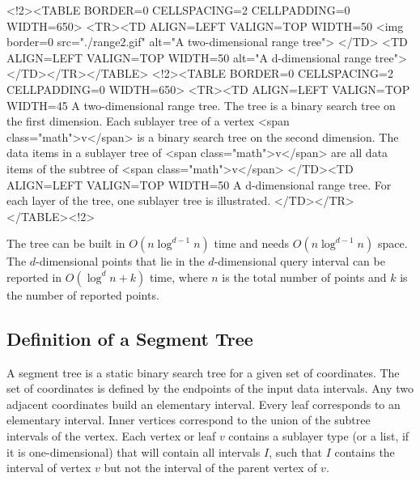 \begin{ccHtmlOnly}
    <!2><TABLE BORDER=0 CELLSPACING=2 CELLPADDING=0 WIDTH=650>
        <TR><TD ALIGN=LEFT VALIGN=TOP WIDTH=50%
    <img border=0 src="./range2.gif" alt="A two-dimensional range tree">
    </TD>
    <TD ALIGN=LEFT VALIGN=TOP WIDTH=50%
alt="A
    d-dimensional range tree">
      </TD></TR></TABLE>
        <!2><TABLE BORDER=0 CELLSPACING=2 CELLPADDING=0 WIDTH=650>
        <TR><TD ALIGN=LEFT VALIGN=TOP WIDTH=45%
    A two-dimensional range tree. The
      tree is a binary search tree on the first dimension. Each
      sublayer tree of a vertex <span class="math">v</span> is a binary search tree on the
second
      dimension. The data items in a sublayer tree of <span class="math">v</span> are
      all data items of the subtree of <span class="math">v</span>
 </TD><TD ALIGN=LEFT VALIGN=TOP WIDTH=50%
A d-dimensional range tree. For
      each layer of the tree, one
      sublayer tree is illustrated.
 </TD></TR>
        </TABLE><!2>

\end{ccHtmlOnly}


The tree can be built in  $O(n\log^{d-1} n)$ time and
needs  $O(n\log^{d-1} n)$ space. The $d$-dimensional points that lie in the
$d$-dimensional query interval can be reported in $O(\log^dn+k)$ time,
where $n$ is the total number of points and $k$ is the number of
reported points. 

\subsection{Definition of a Segment Tree}
A segment tree is a static binary search tree for a given set of
coordinates. The set of coordinates is defined by the endpoints
of the input data intervals. Any two adjacent coordinates
build an elementary interval. Every leaf corresponds to an
elementary interval.
Inner vertices
correspond to the union of the subtree intervals of the vertex.
Each vertex or leaf $v$ contains a sublayer type (or a
list, if it is one-dimensional) that will contain all intervals $I$, such that
$I$  contains the interval of vertex $v$ but not the interval
of the parent vertex of $v$.

